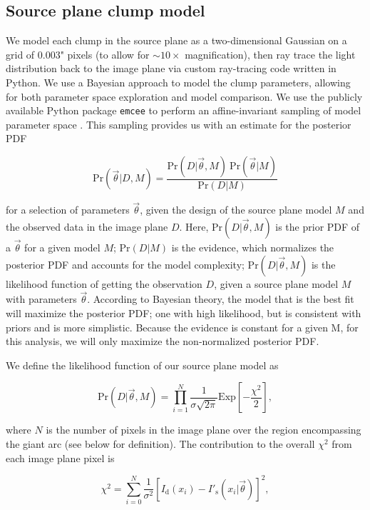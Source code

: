 \subsection{Source plane clump model}
We model each clump in the source plane as a two-dimensional Gaussian on a grid of 0.003" pixels (to allow for $\sim10\times$ magnification), then ray trace the light distribution back to the image plane via custom ray-tracing code written in Python. We use a Bayesian approach to model the clump parameters, allowing for both parameter space exploration and model comparison. We use the publicly available Python package \texttt{emcee} to perform an affine-invariant sampling of model parameter space \citep{Foreman-Mackey:2013rf}. This sampling provides us with an estimate for the posterior PDF

\begin{equation}
\mathrm{Pr}(\vec\theta | D,M) = \frac{\mathrm{Pr}(D | \vec\theta, M)\ \mathrm{Pr}(\vec\theta | M)}{\mathrm{Pr}(D | M)}
\end{equation}

\noindent for a selection of parameters $\vec\theta$, given the design of the source plane model $M$ and the observed data in the image plane $D$. Here, $\mathrm{Pr}(D | \vec\theta, M)$ is the prior PDF of a $\vec\theta$ for a given model $M$; $\mathrm{Pr}(D | M)$ is the evidence, which normalizes the posterior PDF and accounts for the model complexity; $\mathrm{Pr}(D | \vec\theta, M)$ is the likelihood function of getting the observation $D$, given a source plane model $M$ with parameters $\vec\theta$. According to Bayesian theory, the model that is the best fit will maximize the posterior PDF; one with high likelihood, but is consistent with priors and is more simplistic. Because the evidence is constant for a given M, for this analysis, we will only maximize the non-normalized posterior PDF.

We define the likelihood function of our source plane model as

\begin{equation}
\mathrm{Pr}(D | \vec\theta, M) = \prod_{i=1}^{N} \frac{1}{\sigma\sqrt{2\pi}}\mathrm{Exp}\left[-\frac{\chi^2}{2} \right],
\end{equation}

\noindent where $N$ is the number of pixels in the image plane over the region encompassing the giant arc (see below for definition). The contribution to the overall $\chi^2$ from each image plane pixel is

\begin{equation}
\chi^2  = \sum_{i=0}^{N}\frac{1}{\sigma^2}[I_\mathrm{d}(x_i)-I'_\mathrm{s}(x_i | \vec\theta)]^2,
\end{equation}

